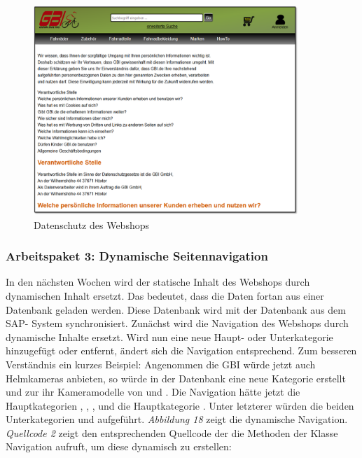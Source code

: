 \begin{figure}
\begin{center}
\includegraphics[width=10cm]{Bilder/Abbildung8-DatenschutzDesWebshops.png}
\end{center}
\caption{Datenschutz des Webshops}
\end{figure}

\newpage
\subsubsection{Arbeitspaket 3: Dynamische Seitennavigation}

In den nächsten Wochen wird der statische Inhalt des Webshops durch dynamischen Inhalt ersetzt. Das bedeutet, dass die Daten fortan aus einer Datenbank geladen werden. Diese Datenbank wird mit der Datenbank aus dem SAP- System synchronisiert. Zunächst wird die Navigation des Webshops durch dynamische Inhalte ersetzt. Wird nun eine neue Haupt- oder Unterkategorie hinzugefügt oder entfernt, ändert sich die Navigation entsprechend. Zum besseren Verständnis ein kurzes Beispiel: Angenommen die GBI würde jetzt auch Helmkameras anbieten, so würde in der Datenbank eine neue Kategorie \grqq{} erstellt und zur ihr Kameramodelle von \grqq{} und \grqq{}. Die Navigation hätte jetzt die Hauptkategorien \grqq{}, \grqq{}, \grqq{}, \grqq{} und die Hauptkategorie \grqq{}. Unter letzterer würden die beiden Unterkategorien \grqq{} und \grqq{} aufgeführt. \textit{Abbildung 18} zeigt die dynamische Navigation.
\textit{Quellcode 2} zeigt den entsprechenden Quellcode der die Methoden der Klasse Navigation aufruft, um diese dynamisch zu erstellen:

